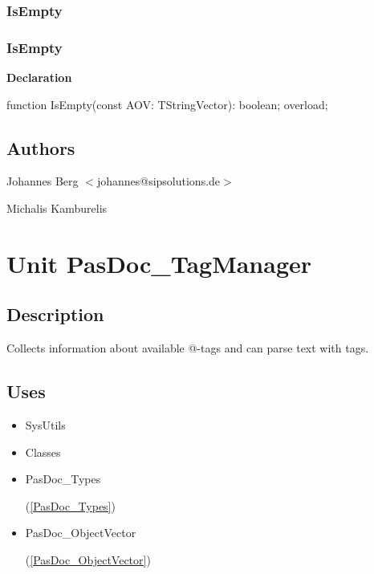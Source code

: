 \documentclass{report}
\newif\ifpdf
\begin{document}
\subsection*{\large{\textbf{IsEmpty}}\normalsize\hspace{1ex}\hrulefill}
\else
\subsection*{IsEmpty}
\fi
\label{PasDoc_StringVector-IsEmpty}
\begin{list}{}{
\setlength{\itemindent}{0cm}
\setlength{\listparindent}{0cm}
\setlength{\leftmargin}{\evensidemargin}
\addtolength{\leftmargin}{\tmplength}
\settowidth{\labelsep}{X}
\addtolength{\leftmargin}{\labelsep}
\setlength{\labelwidth}{\tmplength}
}
\item[\textbf{Declaration}\hfill]
\ifpdf
\begin{flushleft}
\fi
\begin{ttfamily}
function IsEmpty(const AOV: TStringVector): boolean; overload;\end{ttfamily}

\ifpdf
\end{flushleft}
\fi

\end{list}
\section{Authors}
\par
Johannes Berg {$<$}johannes@sipsolutions.de{$>$}

\par
Michalis Kamburelis

\chapter{Unit PasDoc{\_}TagManager}
\label{PasDoc_TagManager}
\section{Description}
Collects information about available @{-}tags and can parse text with tags.
\section{Uses}
\begin{itemize}
\item \begin{ttfamily}SysUtils\end{ttfamily}\item \begin{ttfamily}Classes\end{ttfamily}\item \begin{ttfamily}PasDoc{\_}Types\end{ttfamily}(\ref{PasDoc_Types})\item \begin{ttfamily}PasDoc{\_}ObjectVector\end{ttfamily}(\ref{PasDoc_ObjectVector})\end{itemize}
\end{document}

